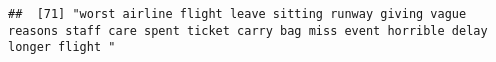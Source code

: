 \documentclass[
]{article}
\begin{document}
\begin{verbatim}
##  [71] "worst airline flight leave sitting runway giving vague reasons staff care spent ticket carry bag miss event horrible delay longer flight "                                                                                                                                                                                                                                                                                                                                                                                                                                                                                                                                                                                                                                                                                                                                                                                                                                                                                                                                                                                                                                                                                                                                                                                                                                                                                                                                                                                                                                                                                                                                                                                                                                                     

\end{verbatim}
\end{document}
